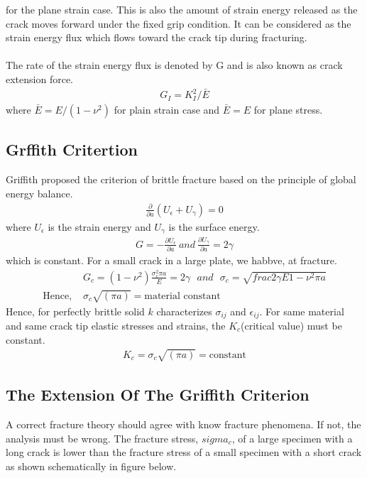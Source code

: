 \documentclass[12pt]{article}
\begin{document}
for the plane strain case. This is also the amount of strain energy released as the crack moves forward
under the fixed grip condition. It can be considered as the strain energy flux which flows toward the
crack tip during fracturing.
\\\\The rate of the strain energy flux is denoted by G and is also known as crack extension force.
\begin{align*}
    G_I = K_{I}^{2}/\bar{E} \tag{4} \label{4}
\end{align*}
where $\bar E = E/(1 - \nu^2)$ for plain strain case and $\bar{E} = E$ for plane stress.






\subsection{Grffith Critertion}
Griffith proposed the criterion of brittle fracture based on the principle of global energy balance.
\begin{align}
    \frac{\partial}{\partial a}(U_\epsilon + U_\gamma) = 0 \tag{5} \label{5}
\end{align}
where $U_\epsilon$  is the strain energy and $U_\gamma$ is the surface energy.
\begin{align*}
    G = -\frac{\partial U_\epsilon}{\partial a} \ and \ \frac{\partial U_\gamma}{\partial a} = 2 \gamma
\end{align*}
which is constant. For a small crack in a large plate, we habbve, at fracture.
\begin{align*}
    &G_c = (1 - \nu ^ 2)\frac{\sigma_{c} ^ 2 \pi a}{E} = 2 \gamma \ \ \ and \ \ \ \sigma_c = \sqrt{frac{2 \gamma E}{1 - \nu ^ 2 } \pi a}
    \\\text{Hence, \ \ \ \ \ \ \ \ \ \ \ \ \ } & \sigma_c \sqrt{(\pi a)} = \text{material constant}
\end{align*}
Hence, for perfectly brittle solid $k$ characterizes $\sigma_{ij}$ and $\epsilon_{ij}$.
For same material and same crack tip elastic stresses and strains, the $K_c$(critical value) must be constant.
\begin{align*}
    K_c = \sigma_c \sqrt{(\pi a)} = \text {constant}
\end{align*}

\subsection{The Extension Of The Griffith Criterion}
A correct fracture theory should agree with know fracture phenomena. If not, the analysis must 
be wrong. The fracture stress, $sigma_c$, of a large specimen with a long crack is lower
than the fracture stress of a small specimen with a short crack as shown schematically in figure
below.
\end{document}
